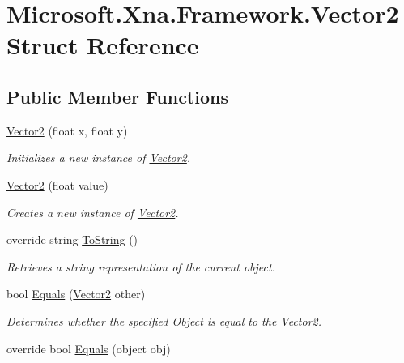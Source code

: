 \hypertarget{struct_microsoft_1_1_xna_1_1_framework_1_1_vector2}{}\section{Microsoft.\+Xna.\+Framework.\+Vector2 Struct Reference}
\label{struct_microsoft_1_1_xna_1_1_framework_1_1_vector2}
\subsection*{Public Member Functions}
\begin{DoxyCompactItemize}
\item 
\hyperlink{struct_microsoft_1_1_xna_1_1_framework_1_1_vector2_af0241a60a6781f9fcbc649909cc64464}{Vector2} (float x, float y)
\begin{DoxyCompactList}\small\item\em Initializes a new instance of \hyperlink{struct_microsoft_1_1_xna_1_1_framework_1_1_vector2}{Vector2}.\end{DoxyCompactList}\item 
\hyperlink{struct_microsoft_1_1_xna_1_1_framework_1_1_vector2_a665199e0351f657cf0dc463712d78db1}{Vector2} (float value)
\begin{DoxyCompactList}\small\item\em Creates a new instance of \hyperlink{struct_microsoft_1_1_xna_1_1_framework_1_1_vector2}{Vector2}.\end{DoxyCompactList}\item 
override string \hyperlink{struct_microsoft_1_1_xna_1_1_framework_1_1_vector2_aa7e3d5988c5976a0b9ca2e9428e5b717}{To\+String} ()
\begin{DoxyCompactList}\small\item\em Retrieves a string representation of the current object.\end{DoxyCompactList}\item 
bool \hyperlink{struct_microsoft_1_1_xna_1_1_framework_1_1_vector2_a0425aba4927eed9f7d1227a8701a3f98}{Equals} (\hyperlink{struct_microsoft_1_1_xna_1_1_framework_1_1_vector2}{Vector2} other)
\begin{DoxyCompactList}\small\item\em Determines whether the specified Object is equal to the \hyperlink{struct_microsoft_1_1_xna_1_1_framework_1_1_vector2}{Vector2}.\end{DoxyCompactList}\item 
override bool \hyperlink{struct_microsoft_1_1_xna_1_1_framework_1_1_vector2_a085fab7a69388875b5bb337077162411}{Equals} (object obj)

\end{DoxyCompactItemize}
